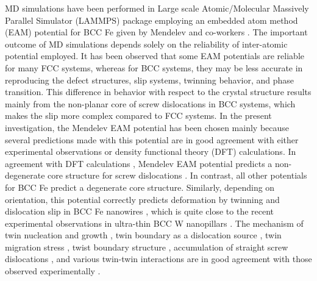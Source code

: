 \documentclass[%
reprint,%
 amssymb, amsmath,%
 aip,apl,%
]{revtex4-1}
\begin{document}
MD simulations have been performed in Large scale Atomic/Molecular Massively Parallel Simulator (LAMMPS) package \cite{LAMMPS} 
employing an embedded atom method (EAM) potential for BCC Fe given by Mendelev and co-workers \cite{Mendelev}. The important 
outcome of MD simulations depends solely on the reliability of inter-atomic potential employed. It has been observed that some 
EAM potentials are reliable for many FCC systems, whereas for BCC systems, they may be less accurate in reproducing the defect 
structures, slip systems, twinning behavior, and phase transition. This difference in behavior with respect to the crystal 
structure results mainly from the non-planar core of screw dislocations in BCC systems, which makes the slip more complex compared 
to FCC systems. In the present investigation, the Mendelev EAM potential has been chosen mainly because several predictions made 
with this potential are in good agreement with either experimental observations or density functional theory (DFT) calculations. 
In agreement with DFT calculations \cite{core-DFT}, Mendelev EAM potential predicts a non-degenerate core structure for screw 
dislocations \cite{non-degenerate}. In contrast, all other potentials for BCC Fe predict a degenerate core structure. Similarly, 
depending on orientation, this potential correctly predicts deformation by twinning and dislocation slip in BCC Fe nanowires 
\cite{Sai-CMS16,Healy15,Sai-CMS15,Sai-MSEA15,ADutta}, which is quite close to the recent experimental observations in ultra-thin 
BCC W nanopillars \cite{Wang-Nature}. The mechanism of twin nucleation and growth \cite{Sai-CMS15,Sai-PhilMag16}, twin boundary 
as a dislocation source \cite{Sai-PhilMag16,ADutta}, twin migration stress \cite{Sai-CMS15,Ohja-PhilMag}, twist boundary structure 
\cite{Sai-PhilMagLett}, accumulation of straight screw dislocations \cite{Sai-MSEA15}, and various twin-twin interactions 
\cite{Sai-PhilMag16,Ohja-PhilMag} are in good agreement with those observed experimentally \cite{Ohja-PhilMag,Paxton,Hull,Ohr-TWGB}.
\end{document}
